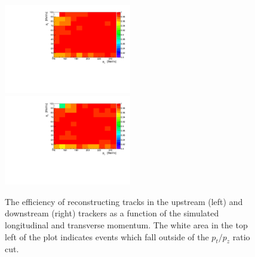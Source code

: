   \begin{figure}[p]
    \centering
    \includegraphics[width=0.495\textwidth, angle=0]{08-Performance/upstream_track_efficiency.pdf}
    \includegraphics[width=0.495\textwidth, angle=0]{08-Performance/downstream_track_efficiency.pdf}\\
    \caption{\label{fig:track_efficiency} The efficiency of reconstructing tracks in the upstream (left) and downstream (right) trackers as a function of the simulated longitudinal and transverse momentum. The white area in the top left of the plot indicates events which fall outside of the $p_t/p_z$ ratio cut.}
  \end{figure}

  
  
